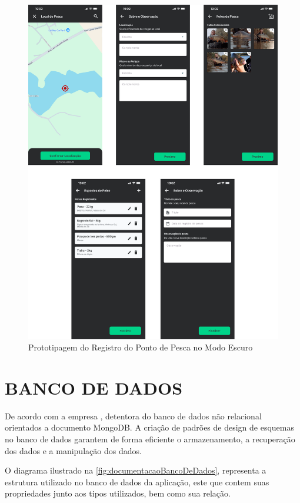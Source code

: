 \begin{figure}[H]
    \centering
    \caption{Prototipagem do Registro do Ponto de Pesca no Modo Escuro}
    \label{fig:prototipagemSpotRegisterDark}
    \includegraphics[scale=0.30]{./dados/figuras/prototipagem-dark-spot-register.png}
\end{figure}

\section{BANCO DE DADOS}
\label{sec:desenvolvimentobancodedados}

De acordo com a empresa , detentora do banco de dados não relacional orientados a documento MongoDB. A criação de padrões de design de esquemas no banco de dados garantem de forma eficiente o armazenamento, a recuperação dos dados e a manipulação dos dados.

O diagrama ilustrado na \autoref{fig:documentacaoBancoDeDados}, representa a estrutura utilizado no banco de dados da aplicação, este que contem suas propriedades junto aos tipos utilizados, bem como sua relação.

